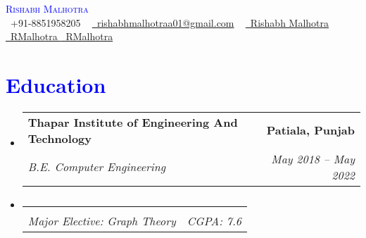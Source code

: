 \documentclass[letterpaper,11pt]{article}
\makeatletter
\newcommand{\resumeSubheading}[4]{
  \vspace{-2pt}\item
    \begin{tabular*}{1.0\textwidth}[t]{l@{\extracolsep{\fill}}r}
      \textbf{#1} & \textbf{\small #2} \\
      \textit{\small#3} & \textit{\small #4} \\
    \end{tabular*}\vspace{-7pt}
}
\newcommand{\resumeSubHeadingListStart}{\begin{itemize}[leftmargin=0.0in, label={}]}
\newcommand{\resumeSubHeadingListEnd}{\end{itemize}}
\makeatother
\begin{document}
\begin{center}
    {\Huge \scshape \textcolor{blue}{ Rishabh Malhotra}} \\ \vspace{5pt}
    \small \raisebox{-0.1\height}\faPhone\ +91-8851958205 ~ \href{mailto:rishabhmalhotraa01@gmail.com}{\raisebox{-0.2\height}\faEnvelope\  rishabhmalhotraa01@gmail.com} ~ 
    \href{https://linkedin.com/in/rishabh-malhotra-4536a418b/}{\raisebox{-0.2\height}\faLinkedin\ Rishabh Malhotra}  ~
    \href{https://github.com/Rishabh-malhotraa}{\raisebox{-0.2\height}\faGithub\ RMalhotra   }
    \href{https://linktr.ee/Rishabh_malhotra}{\raisebox{-0.2\height}\faCode\ RMalhotra}
    \vspace{-8pt}
\end{center}\vspace{+10pt}


    \section{\Large \textcolor{blue}{Education}}
  \resumeSubHeadingListStart
    \resumeSubheading
      {Thapar Institute of Engineering And Technology}{Patiala, Punjab}
      {B.E. Computer Engineering }{May 2018 -- May 2022}
    
      \vspace{-18pt} 
      \resumeSubheading{}{}  
      {Major Elective: Graph Theory}
      {CGPA: 7.6}
      
  \resumeSubHeadingListEnd

\end{document}
